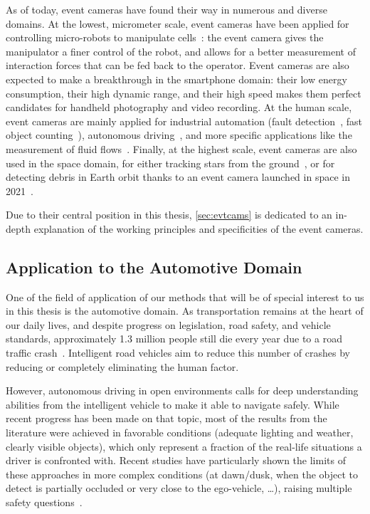 As of today, event cameras have found their way in numerous and diverse domains. At the lowest, micrometer scale, event cameras have been applied for controlling micro-robots to manipulate cells~\cite{Gerena20206DoFOM}: the event camera gives the manipulator a finer control of the robot, and allows for a better measurement of interaction forces that can be fed back to the operator. Event cameras are also expected to make a breakthrough in the smartphone domain: their low energy consumption, their high dynamic range, and their high speed makes them perfect candidates for handheld photography and video recording. At the human scale, event cameras are mainly applied for industrial automation (fault detection~\cite{Li2023IntelligentMF}, fast object counting~\cite{Bialik2023FastOC}), autonomous driving~\cite{Chen2020EventBasedNV}, and more specific applications like the measurement of fluid flows~\cite{Willert2022EventbasedIV}. Finally, at the highest scale, event cameras are also used in the space domain, for either tracking stars from the ground~\cite{Chin2019StarTU}, or for detecting debris in Earth orbit thanks to an event camera launched in space in 2021~\cite{WSU2021WorldFT}.

Due to their central position in this thesis, \cref{sec:evtcams} is dedicated to an in-depth explanation of the working principles and specificities of the event cameras.

\subsection{Application to the Automotive Domain}
One of the field of application of our methods that will be of special interest to us in this thesis is the automotive domain. As transportation remains at the heart of our daily lives, and despite progress on legislation, road safety, and vehicle standards, approximately 1.3 million people still die every year due to a road traffic crash~\cite{Who2018GlobalSR}. Intelligent road vehicles aim to reduce this number of crashes by reducing or completely eliminating the human factor.

However, autonomous driving in open environments calls for deep understanding abilities from the intelligent vehicle to make it able to navigate safely. While recent progress has been made on that topic, most of the results from the literature were achieved in favorable conditions (adequate lighting and weather, clearly visible objects), which only represent a fraction of the real-life situations a driver is confronted with. Recent studies have particularly shown the limits of these approaches in more complex conditions (at dawn/dusk, when the object to detect is partially occluded or very close to the ego-vehicle, \dots), raising multiple safety questions~\cite{Brown2017TheTW,Combs2019AutomatedVA}.

